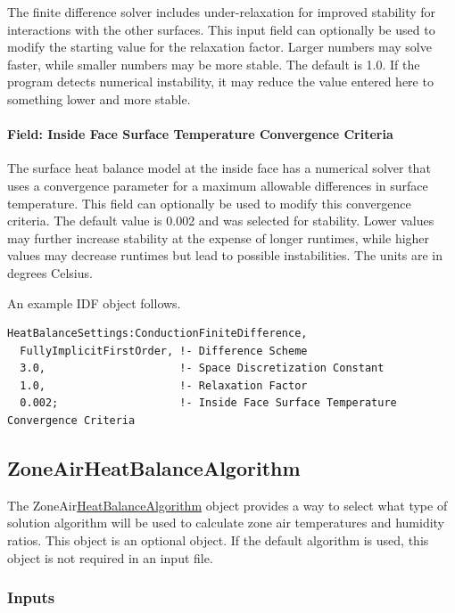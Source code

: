 The finite difference solver includes under-relaxation for improved stability for interactions with the other surfaces. This input field can optionally be used to modify the starting value for the relaxation factor. Larger numbers may solve faster, while smaller numbers may be more stable. The default is 1.0. If the program detects numerical instability, it may reduce the value entered here to something lower and more stable.

\paragraph{Field: Inside Face Surface Temperature Convergence Criteria}\label{field-inside-face-surface-temperature-convergence-criteria}

The surface heat balance model at the inside face has a numerical solver that uses a convergence parameter for a maximum allowable differences in surface temperature. This field can optionally be used to modify this convergence criteria. The default value is 0.002 and was selected for stability. Lower values may further increase stability at the expense of longer runtimes, while higher values may decrease runtimes but lead to possible instabilities. The units are in degrees Celsius.

An example IDF object follows.

\begin{lstlisting}
HeatBalanceSettings:ConductionFiniteDifference,
  FullyImplicitFirstOrder, !- Difference Scheme
  3.0,                     !- Space Discretization Constant
  1.0,                     !- Relaxation Factor
  0.002;                   !- Inside Face Surface Temperature Convergence Criteria
\end{lstlisting}

\subsection{ZoneAirHeatBalanceAlgorithm}\label{zoneairheatbalancealgorithm}

The ZoneAir\hyperref[heatbalancealgorithm]{HeatBalanceAlgorithm} object provides a way to select what type of solution algorithm will be used to calculate zone air temperatures and humidity ratios. This object is an optional object. If the default algorithm is used, this object is not required in an input file.

\subsubsection{Inputs}\label{inputs-8-023}

